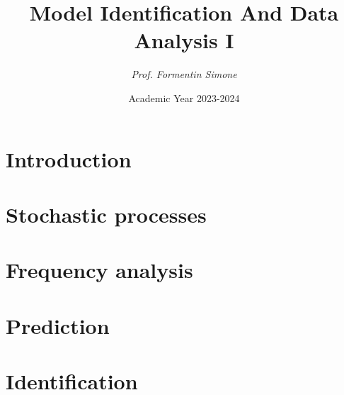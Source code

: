 \documentclass[12pt, a4paper]{report}
\title{\textbf{Model Identification And Data Analysis I}}
\author{\textit{Prof. Formentin Simone}}
\date{Academic Year 2023-2024}
\begin{document}
    \maketitle

    

    \cleardoublepage{}

    \tableofcontents

    \cleardoublepage{}

    \chapter{Introduction}
    
    
    

    \chapter{Stochastic processes}
    
    
    
    
    
    
    
    
    

    \chapter{Frequency analysis}
    
    
    

    \chapter{Prediction}
    
    
    
    
    
    

    \chapter{Identification}
    
    
    
\end{document}
